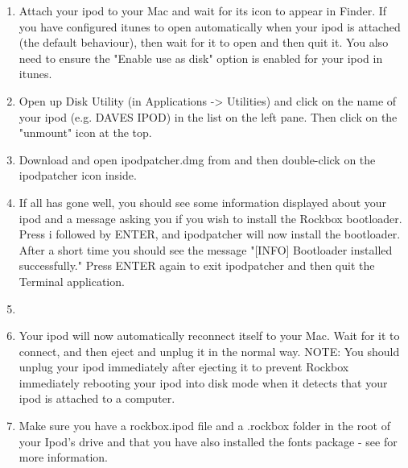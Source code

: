 \begin{enumerate}

\item Attach your ipod to your Mac and wait for its icon to appear in 
Finder. If you have configured itunes to open automatically when your
ipod is attached (the default behaviour), then wait for it to open and
then quit it. You also need to ensure the "Enable use as disk" option
is enabled for your ipod in itunes.

\item Open up Disk Utility (in Applications -> Utilities) and click 
on the name of your ipod (e.g. DAVES IPOD) in the list on the left 
pane. Then click on the "unmount" icon at the top. 

\item Download and open ipodpatcher.dmg from 
and then double-click on the ipodpatcher icon inside. 

\item If all has gone well, you should see some 
information displayed about your ipod and a message asking you if you 
wish to install the Rockbox bootloader. Press i followed by ENTER, and 
ipodpatcher will now install the bootloader. After a short time you 
should see the message "[INFO] Bootloader installed successfully." Press 
ENTER again to exit ipodpatcher and then quit the Terminal application.

\item {}

\item Your ipod will now automatically reconnect itself to your Mac. 
Wait for it to connect, and then eject and unplug it in the normal way. 
NOTE: You should unplug your ipod immediately after ejecting it to 
prevent Rockbox immediately rebooting your ipod into disk mode when it 
detects that your ipod is attached to a computer. 

\item Make sure you have a rockbox.ipod file and a .rockbox folder in the 
root of your Ipod's drive and that you have also installed the fonts
package - see  for more information.

\end{enumerate}

